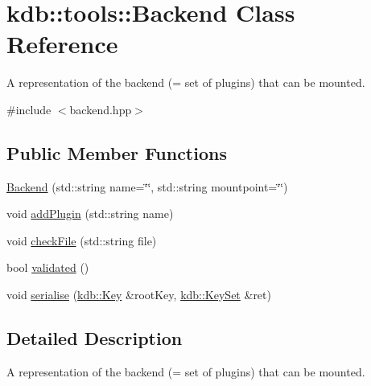 \hypertarget{classkdb_1_1tools_1_1Backend}{\section{kdb\-:\-:tools\-:\-:Backend Class Reference}
\label{classkdb_1_1tools_1_1Backend}
}


A representation of the backend (= set of plugins) that can be mounted.  




{\ttfamily \#include $<$backend.\-hpp$>$}

\subsection*{Public Member Functions}
\begin{DoxyCompactItemize}
\item 
\hyperlink{classkdb_1_1tools_1_1Backend_ae1e876a38d1e9ab456830edc0a31350e}{Backend} (std\-::string name=\char`\"{}\char`\"{}, std\-::string mountpoint=\char`\"{}\char`\"{})
\item 
void \hyperlink{classkdb_1_1tools_1_1Backend_ac8570864ee3fcff56316f435a2f928ee}{add\-Plugin} (std\-::string name)
\item 
void \hyperlink{classkdb_1_1tools_1_1Backend_ab714909e0ca3f871ab06f4db00d77e2f}{check\-File} (std\-::string file)
\item 
bool \hyperlink{classkdb_1_1tools_1_1Backend_a61182a9bd27aaefe0347ad5ea2db9b33}{validated} ()
\item 
void \hyperlink{classkdb_1_1tools_1_1Backend_acb6f43d0d7eaf40570c37564aa0f3c53}{serialise} (\hyperlink{classkdb_1_1Key}{kdb\-::\-Key} \&root\-Key, \hyperlink{classkdb_1_1KeySet}{kdb\-::\-Key\-Set} \&ret)
\end{DoxyCompactItemize}


\subsection{Detailed Description}
A representation of the backend (= set of plugins) that can be mounted. 

